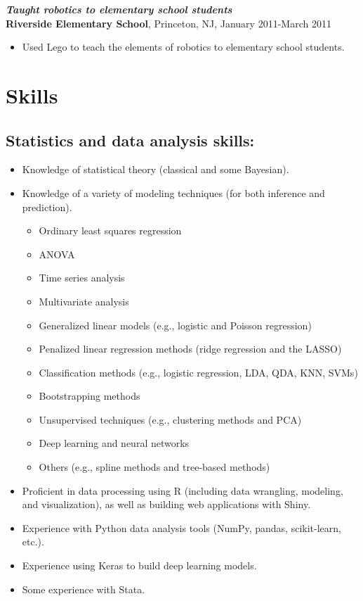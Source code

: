 \documentclass[letterpaper,12pt]{article}
\begin{document}
\textit{\textbf{Taught robotics to elementary school students}} \\
\textbf{Riverside Elementary School}, Princeton, NJ, January
2011-March 2011
\begin{itemize}
\item Used Lego to teach the elements of robotics to elementary school
  students.
\end{itemize}

\fi

\iffalse
\section*{Skills}

\subsection*{Statistics and data analysis skills:}

\begin{itemize}
\item Knowledge of statistical theory (classical and some Bayesian).
\item Knowledge of a variety of modeling techniques (for both
  inference and prediction).
\begin{itemize}
\item Ordinary least squares regression
\item ANOVA
\item Time series analysis
\item Multivariate analysis
\item Generalized linear models (e.g., logistic and Poisson
  regression)
\item Penalized linear regression methods (ridge regression and the
  LASSO)
\item Classification methods (e.g., logistic regression, LDA, QDA,
  KNN, SVMs)
\item Bootstrapping methods
\item Unsupervised techniques (e.g., clustering methods and PCA)
\item Deep learning and neural networks
\item Others (e.g., spline methods and tree-based methods)
\end{itemize}
\item Proficient in data processing using R (including data wrangling,
  modeling, and visualization), as well as building web applications
  with Shiny.
\item Experience with Python data analysis tools (NumPy, pandas,
  scikit-learn, etc.).
\item Experience using Keras to build deep learning models.
\item Some experience with Stata.
\end{itemize}
\end{document}
